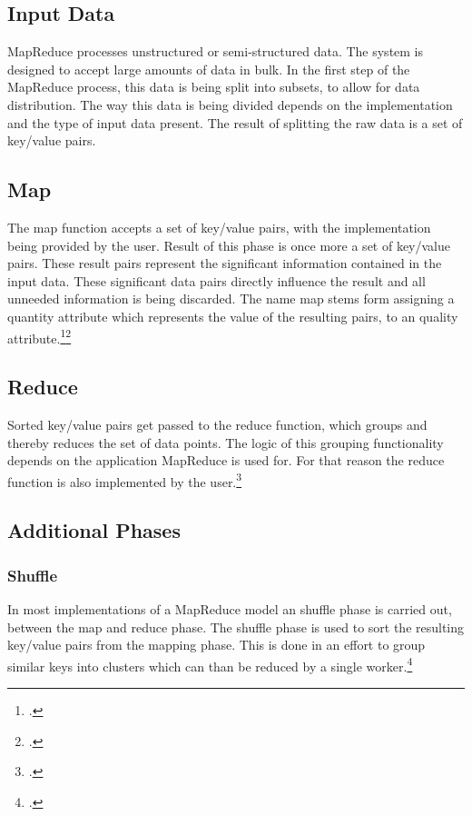 \documentclass[12pt, letterpaper]{article}
\begin{document}
\subsection{Input Data}

MapReduce processes unstructured or semi-structured data. The system is designed to accept large amounts of data in bulk. In the first step of the MapReduce process, this data is being split into subsets, to allow for data distribution. The way this data is being divided depends on the implementation and the type of input data present. The result of splitting the raw data is a set of key/value pairs.

\subsection{Map}

The map function accepts a set of key/value pairs, with the implementation being provided by the user. Result of this phase is once more a set of key/value pairs. These result pairs represent the significant information contained in the input data. These significant data pairs directly influence the result and all unneeded information is being discarded. The name map stems form assigning a quantity attribute which represents the value of the resulting pairs, to an quality attribute.\footcite{uniLeibzigMapReduce}\footcite{mapreducePaper}

\subsection{Reduce}

Sorted key/value pairs get passed to the reduce function, which groups and thereby reduces the set of data points. The logic of this grouping functionality depends on the application MapReduce is used for. For that reason the reduce function is also implemented by the user.\footcite{uniLeibzigMapReduce}

\pagebreak

\subsection{Additional Phases}

\subsubsection{Shuffle}
In most implementations of a MapReduce model an shuffle phase is carried out, between the map and reduce phase. The shuffle phase is used to sort the resulting key/value pairs from the mapping phase. This is done in an effort to group similar keys into clusters which can than be reduced by a single worker.\footcite{uniLeibzigMapReduce}\newline
\end{document}
